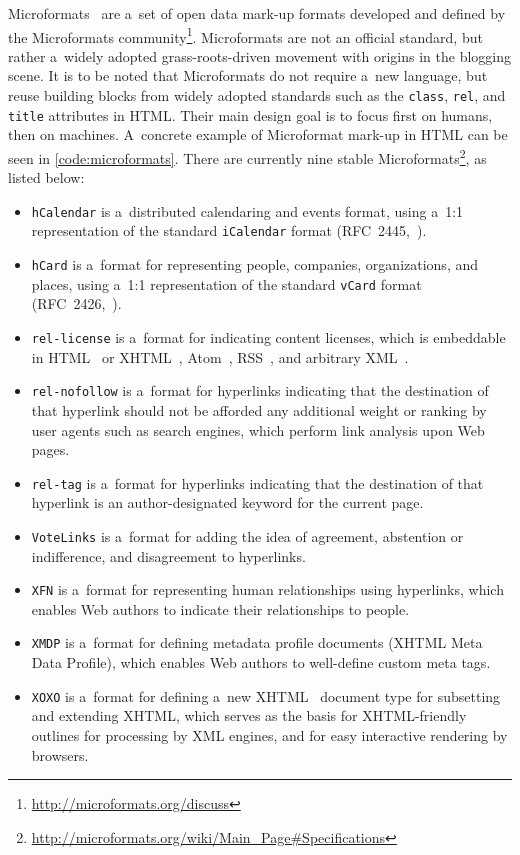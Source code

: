 Microformats~\cite{celik2006microformats} are a~set of
open data mark-up formats developed
and defined by the Microformats
community\footnote{\url{http://microformats.org/discuss}}.
Microformats are not an official standard,
but rather a~widely adopted grass-roots-driven movement
with origins in the blogging scene.
It is to be noted that Microformats do not require a~new language,
but reuse building blocks from widely adopted standards
such as the \texttt{class}, \texttt{rel}, and \texttt{title}
attributes in HTML.
Their main design goal is to focus first on humans,
then on machines.
A~concrete example of Microformat mark-up in HTML
can be seen in \autoref{code:microformats}.
There are currently nine stable
Microformats\footnote{\url{http://microformats.org/wiki/Main_Page\#Specifications}},
as listed below:

\begin{itemize}
  \item \texttt{hCalendar} is a~distributed calendaring and
        events format, using a~1:1 representation of the standard
        \texttt{iCalendar} format
        (RFC~2445,~\cite{dawson1998icalendar}).
  \item \texttt{hCard} is a~format for representing people,
        companies, organizations, and places, using a~1:1
        representation of the standard \texttt{vCard} format
        (RFC~2426,~\cite{dawson1998vcard}).
  \item \texttt{rel-license} is a~format for indicating content
        licenses, which is embeddable in
        HTML~\cite{raggett1999html} or
        XHTML~\cite{pemberton2000xhtml},
        Atom~\cite{nottingham2005atom},
        RSS~\cite{cadenhead2006rss},
        and arbitrary XML~\cite{bray2008xml}.
  \item \texttt{rel-nofollow} is a~format for hyperlinks
        indicating that the destination of that hyperlink should
        not be afforded any additional weight or ranking by user
        agents such as search engines, which perform link
        analysis upon Web pages.
  \item \texttt{rel-tag} is a~format for hyperlinks indicating
        that the destination of that hyperlink is an
        author-designated keyword for the current page.
  \item \texttt{VoteLinks} is a~format for adding the idea of
        agreement, abstention or indifference, and disagreement
        to hyperlinks.
  \item \texttt{XFN} is a~format for representing human
        relationships using hyperlinks, which enables Web authors
        to indicate their relationships to people.
  \item \texttt{XMDP} is a~format for defining metadata profile
        documents (XHTML Meta Data Profile), which enables Web
        authors to well-define custom meta tags.
  \item \texttt{XOXO} is a~format for defining a~new
        XHTML~\cite{pemberton2000xhtml}
        document type for subsetting and extending XHTML,
        which serves as the basis for XHTML-friendly outlines for
        processing by XML engines, and for easy interactive
        rendering by browsers.
\end{itemize}

